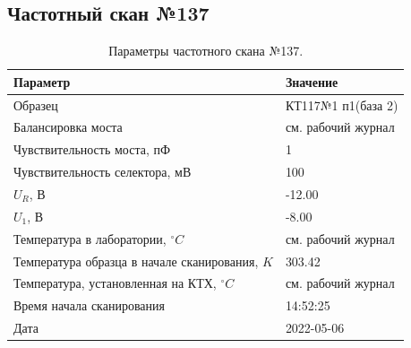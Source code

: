 \subsection{Частотный скан №137}
\begin{table}[!ht]
    \centering
    \caption{Параметры частотного скана №137.}
    \begin{tabular}{|l|l|}
        \hline
        Параметр                                       & Значение                  \\ \hline
        Образец                                        & КТ117№1 п1(база 2)        \\ \hline
        Балансировка моста                             & см. рабочий журнал        \\ \hline
        Чувствительность моста, пФ                     & 1                         \\ \hline
        Чувствительность селектора, мВ                 & 100                       \\ \hline
        $U_R$, В                                       & -12.00                    \\ \hline
        $U_1$, В                                       & -8.00                     \\ \hline
        Температура в лаборатории, $^\circ C$          & см. рабочий журнал        \\ \hline
        Температура образца в начале сканирования, $K$ & 303.42                    \\ \hline
        Температура, установленная на КТХ, $^\circ C$  & см. рабочий журнал        \\ \hline
        Время начала сканирования                      & 14:52:25                  \\ \hline
        Дата                                           & 2022-05-06                \\ \hline
    \end{tabular}
    \label{table:frequency_scan_137}
\end{table}

